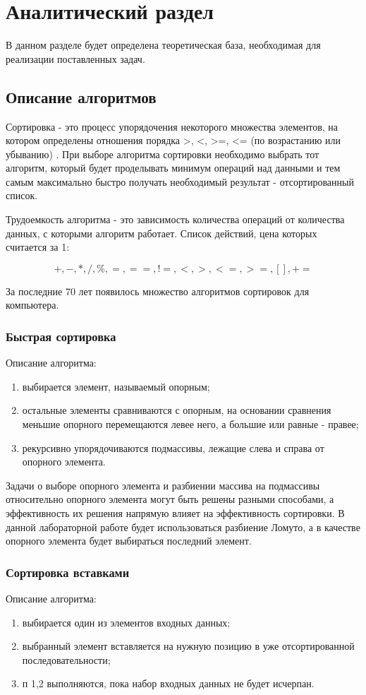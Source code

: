 \chapter{Аналитический раздел}
\label{cha:analysis}

В данном разделе будет определена теоретическая база, необходимая для реализации поставленных задач.

\section{Описание алгоритмов}
Сортировка - это процесс упорядочения некоторого множества элементов, на котором определены отношения порядка >, <, >=, <= (по возрастанию или убыванию) \cite{pav}. При выборе алгоритма сортировки необходимо выбрать тот алгоритм, который будет проделывать минимум операций над данными и тем самым максимально быстро получать необходимый результат - отсортированный список.

Трудоемкость алгоритма - это зависимость количества операций от количества данных, с которыми алгоритм работает. Список действий, цена которых считается за 1:

$$
+, -, *, /, \%, =, ==, !=, <, >, <=, >=, [], +=
$$

За последние 70 лет появилось множество алгоритмов сортировок для компьютера\cite{knuth}.

\subsection{Быстрая сортировка}
Описание алгоритма:
\begin{enumerate}
	\item выбирается элемент, называемый опорным;
	\item остальные элементы сравниваются с опорным, на основании сравнения меньшие опорного перемещаются левее него, а большие или равные - правее;
	\item рекурсивно упорядочиваются подмассивы, лежащие слева и справа от опорного элемента.
\end{enumerate}
Задачи о выборе опорного элемента и разбиении массива на подмассивы относительно опорного элемента могут быть решены разными способами, а эффективность их решения напрямую влияет на эффективность сортировки. В данной лабораторной работе будет использоваться разбиение Ломуто, а в качестве опорного элемента будет выбираться последний элемент.

\subsection{Сортировка вставками}
Описание алгоритма:
\begin{enumerate}
    \item выбирается один из элементов входных данных;
	\item выбранный элемент вставляется на нужную позицию в уже отсортированной последовательности;
	\item п 1,2 выполняются, пока набор входных данных не будет исчерпан.
\end{enumerate}

